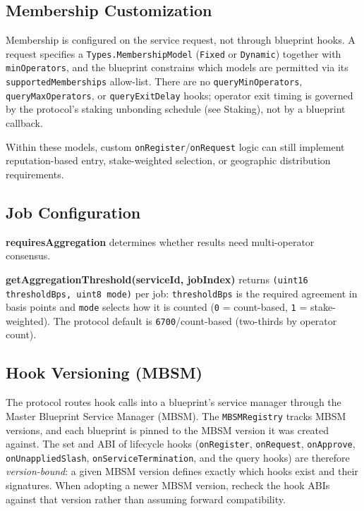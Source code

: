\documentclass[11pt,a4paper]{article}
\begin{document}
\subsection{Membership Customization}

Membership is configured on the service request, not through blueprint hooks. A request specifies a \texttt{Types.MembershipModel} (\texttt{Fixed} or \texttt{Dynamic}) together with \texttt{minOperators}, and the blueprint constrains which models are permitted via its \texttt{supportedMemberships} allow-list. There are no \texttt{queryMinOperators}, \texttt{queryMaxOperators}, or \texttt{queryExitDelay} hooks; operator exit timing is governed by the protocol's staking unbonding schedule (see Staking), not by a blueprint callback.

Within these models, custom \texttt{onRegister}/\texttt{onRequest} logic can still implement reputation-based entry, stake-weighted selection, or geographic distribution requirements.

\subsection{Job Configuration}

\textbf{requiresAggregation} determines whether results need multi-operator consensus.

\textbf{getAggregationThreshold(serviceId, jobIndex)} returns \texttt{(uint16 thresholdBps, uint8 mode)} per job: \texttt{thresholdBps} is the required agreement in basis points and \texttt{mode} selects how it is counted (\texttt{0} = count-based, \texttt{1} = stake-weighted). The protocol default is \texttt{6700}/count-based (two-thirds by operator count).

\subsection{Hook Versioning (MBSM)}

The protocol routes hook calls into a blueprint's service manager through the Master Blueprint Service Manager (MBSM). The \texttt{MBSMRegistry} tracks MBSM versions, and each blueprint is pinned to the MBSM version it was created against. The set and ABI of lifecycle hooks (\texttt{onRegister}, \texttt{onRequest}, \texttt{onApprove}, \texttt{onUnappliedSlash}, \texttt{onServiceTermination}, and the query hooks) are therefore \emph{version-bound}: a given MBSM version defines exactly which hooks exist and their signatures. When adopting a newer MBSM version, recheck the hook ABIs against that version rather than assuming forward compatibility.
\end{document}
